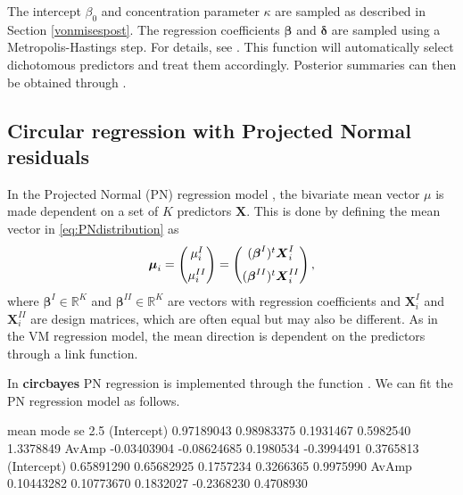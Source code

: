 \documentclass{article}
\newcommand{\code}[1]{\texttt{\detokenize{#1}}}
\newcommand{\pkg}[1]{\textbf{#1}}
\newenvironment{CodeChunk}{}{}
\begin{document}
The intercept \(\beta_0\) and concentration parameter \(\kappa\) are
sampled as described in Section \ref{vonmisespost}. The regression
coefficients \(\boldsymbol{\beta}\) and \(\boldsymbol{\delta}\) are
sampled using a Metropolis-Hastings step. For details, see
\citep{mulder2017bayesian}. This function will automatically select
dichotomous predictors and treat them accordingly. Posterior summaries
can then be obtained through \code{coef(fit_vmreg)}.

\hypertarget{circular-regression-with-projected-normal-residuals}{%
	\subsection{Circular regression with Projected Normal
		residuals}\label{circular-regression-with-projected-normal-residuals}}

\label{projreg}

In the Projected Normal (PN) regression model \citep{nunez2011bayesian},
the bivariate mean vector \(\mu\) is made dependent on a set of \(K\)
predictors \(\boldsymbol{X}\). This is done by defining the mean vector
in \eqref{eq:PNdistribution} as \begin{equation}
\boldsymbol{\mu}_{i} = \begin{pmatrix}
\mu_{i}^{I}  \vspace{0.2cm}  \\
\mu_{i}^{II}
\end{pmatrix}=\begin{pmatrix}
(\boldsymbol{\beta}^{I})^{t}\boldsymbol{X}_{i}^{I}  \vspace{0.2cm}  \\
(\boldsymbol{\beta}^{II})^{t}\boldsymbol{X}_{i}^{II} 
\end{pmatrix},
\end{equation} where \(\boldsymbol{\beta}^{I} \in \mathbb{R}^K\) and
\(\boldsymbol{\beta}^{II} \in \mathbb{R}^K\) are vectors with regression
coefficients and \(\boldsymbol{X}_{i}^{I}\) and
\(\boldsymbol{X}_{i}^{II}\) are design matrices, which are often equal
but may also be different. As in the VM regression model, the mean
direction is dependent on the predictors through a link function.

In \pkg{circbayes} PN regression is implemented through the function
\code{pn_reg()}. We can fit the PN regression model as follows.

\begin{CodeChunk}
	
		
		\begin{CodeOutput}
		mean        mode        se       2.5%
		(Intercept)  0.97189043  0.98983375 0.1931467  0.5982540 1.3378849
		AvAmp       -0.03403904 -0.08624685 0.1980534 -0.3994491 0.3765813
		(Intercept)  0.65891290  0.65682925 0.1757234  0.3266365 0.9975990
		AvAmp        0.10443282  0.10773670 0.1832027 -0.2368230 0.4708930
		\end{CodeOutput}
		\end{CodeChunk}
		
\end{document}
